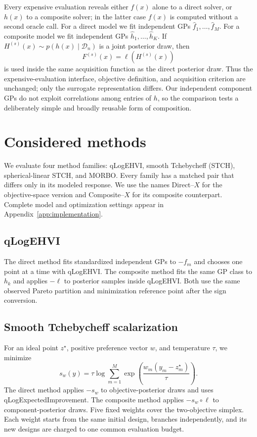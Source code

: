 \documentclass{article}
\newcommand{\composemap}{\ell}
\begin{document}
Every expensive evaluation reveals either $f(x)$ alone to a direct solver, or
$h(x)$ to a composite solver; in the latter case $f(x)$ is computed without a
second oracle call.  For a direct model we fit independent GPs
$\widehat f_1,\ldots,\widehat f_M$.  For a composite model we fit independent
GPs $\widehat h_1,\ldots,\widehat h_K$.  If
$H^{(s)}(x)\sim p(h(x)\mid\mathcal D_n)$ is a joint posterior draw, then
\begin{equation}
  F^{(s)}(x)=\composemap\!\left(H^{(s)}(x)\right)
  \label{eq:posterior-pushforward}
\end{equation}
is used inside the same acquisition function as the direct posterior draw.
Thus the expensive-evaluation interface, objective definition, and acquisition
criterion are unchanged; only the surrogate representation differs.  Our
independent component GPs do not exploit correlations among entries of $h$, so
the comparison tests a deliberately simple and broadly reusable form of
composition.

\section{Considered methods}
\label{sec:methods}

We evaluate four method families: qLogEHVI, smooth Tchebycheff (STCH),
spherical-linear STCH, and MORBO.  Every family has a matched pair that differs
only in its modeled response.  We use the names Direct--$X$ for the
objective-space version and Composite--$X$ for its composite counterpart.
Complete model and optimization settings appear in
Appendix~\ref{app:implementation}.

\subsection{qLogEHVI}
The direct method fits standardized independent GPs to $-f_m$ and chooses one
point at a time with qLogEHVI.  The composite method fits the same GP class to
$h_k$ and applies $-\composemap$ to posterior samples inside qLogEHVI.  Both use
the same observed Pareto partition and minimization reference point after the
sign conversion.

\subsection{Smooth Tchebycheff scalarization}
For an ideal point $z^\star$, positive preference vector $w$, and temperature
$\tau$, we minimize
\begin{equation}
  s_w(y)=\tau\log\sum_{m=1}^{M}
  \exp\!\left(\frac{w_m(y_m-z_m^\star)}{\tau}\right).
  \label{eq:stch}
\end{equation}
The direct method applies $-s_w$ to objective-posterior draws and uses
qLogExpectedImprovement.  The composite method applies
$-s_w\!\circ\composemap$ to component-posterior draws.  Five fixed weights
cover the two-objective simplex.  Each weight starts from the same initial
design, branches independently, and its new designs are charged to one common
evaluation budget.
\end{document}

